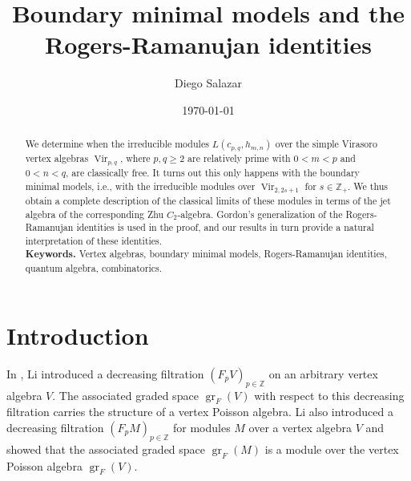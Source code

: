 \documentclass[a4paper, 12pt, reqno]{amsart}
\theoremstyle{remark}
\DeclareMathOperator{\Vir}{Vir}
\DeclareMathOperator{\gr}{gr}
\begin{document}
\setcounter{section}{-1}

\begin{abstract}
  We determine when the irreducible modules $L(c_{p, q}, h_{m, n})$ over the simple Virasoro vertex algebras $\Vir_{p, q}$, where $p, q \ge 2$ are relatively prime with $0 < m < p$ and $0 < n < q$, are classically free.
  It turns out this only happens with the boundary minimal models, i.e., with the irreducible modules over $\Vir_{2, 2s + 1}$ for $s \in \mathbb{Z}_+$.
  We thus obtain a complete description of the classical limits of these modules in terms of the jet algebra of the corresponding Zhu $C_2$-algebra.
  Gordon's generalization of the Rogers-Ramanujan identities is used in the proof, and our results in turn provide a natural interpretation of these identities. \\
  \smallskip
  \noindent \textbf{Keywords.} Vertex algebras, boundary minimal models, Rogers-Ramanujan identities, quantum algebra, combinatorics.
\end{abstract}

\title{Boundary minimal models and the Rogers-Ramanujan identities}
\author{Diego Salazar}
\address{Instituto de Matemática Pura e Aplicada, Rio de Janeiro, RJ, Brazil}
\date{\today}
\maketitle


\section{Introduction}
\label{sec:introduction}

In \cite{li_abelianizing_2005}, Li introduced a decreasing filtration $(F_pV)_{p \in \mathbb{Z}}$ on an arbitrary vertex algebra $V$.
The associated graded space $\gr_F(V)$ with respect to this decreasing filtration carries the structure of a vertex Poisson algebra.
Li also introduced a decreasing filtration $(F_pM)_{p \in \mathbb{Z}}$ for modules $M$ over a vertex algebra $V$ and showed that the associated graded space $\gr_F(M)$ is a module over the vertex Poisson algebra $\gr_F(V)$.
\end{document}
